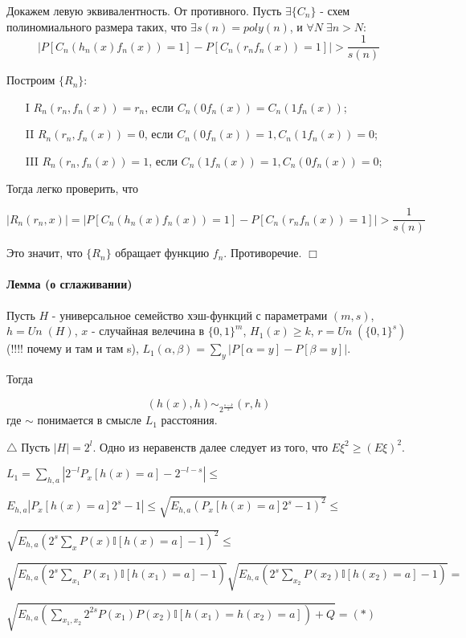 \documentclass[12pt, a4paper]{article}
\newcommand{\uniform}{Un \;}
\begin{document}
Докажем левую эквивалентность. От противного. Пусть $\exists \{C_n\}$ - схем полиномиального размера таких, что $\exists s(n) = poly(n)$, и $\forall N \; \exists n > N$:
\[
 |P[C_n(h_n(x)f_n(x)) = 1] - P[C_n(r_n f_n(x)) = 1]| > \frac{1}{s(n)}
\]

Построим $\{R_n\}$:

\begin{itemize}
 \item[I] $R_n(r_n, f_n(x)) = r_n$, если $C_n(0 f_n(x)) = C_n(1 f_n(x))$;
 \item[II] $R_n(r_n, f_n(x)) = 0$, если $C_n(0 f_n(x)) = 1, C_n(1 f_n(x)) = 0$;
 \item[III] $R_n(r_n, f_n(x)) = 1$, если $C_n(1 f_n(x)) = 1, C_n(0 f_n(x)) = 0$;
\end{itemize}

Тогда легко проверить, что 

\[
 |R_n(r_n, x)| = |P[C_n(h_n(x)f_n(x)) = 1] - P[C_n(r_n f_n(x)) = 1]| > \frac{1}{s(n)}
\]

Это значит, что $\{R_n\}$ обращает функцию $f_n$. Противоречие. $\Box$



\paragraph{Лемма (о сглаживании)} Пусть $H$ - универсальное семейство хэш-функций с параметрами $(m, s)$, $h = \uniform(H)$, $x$ - случайная велечина в $\{0, 1\}^m$, $H_1(x) \geq k$, $r = \uniform(\{0, 1\}^s)$ (!!!! почему и там и там s), $L_1(\alpha, \beta) = \sum\limits_y |P[\alpha=y] - P[\beta=y]|$.

Тогда

$$
 (h(x), h) \sim_{2^{\frac{s - k}{2}}} (r, h) 
$$
где $\sim$ понимается в смысле $L_1$ расстояния.

$\triangle$ Пусть $|H| = 2^l$. Одно из неравенств далее следует из того, что $E \xi^2 \geq (E \xi)^2$.

$L_1 = \sum\limits_{h, a} |2^{-l} P_x[h(x) = a] - 2^{-l-s}| \leq$

$E_{h, a} |P_x[h(x) = a] 2^s - 1| \leq \sqrt{E_{h, a} (P_x[h(x) = a] 2^s - 1)^2} \leq$

$\sqrt{E_{h, a} (2^s \sum\limits_x P(x) \mathbb{I}[h(x) = a] - 1)^2} \leq$

$\sqrt{E_{h, a} (2^s \sum\limits_{x_1} P(x_1) \mathbb{I}[h(x_1) = a] - 1)} \sqrt{E_{h, a} (2^s \sum\limits_{x_2} P(x_2) \mathbb{I}[h(x_2) = a] - 1)} =$

$\sqrt{E_{h, a} (\sum\limits_{x_1, x_2} 2^{2s} P(x_1) P(x_2) \mathbb{I}[h(x_1) = h(x_2) = a]) + Q} = (*)$
\end{document}

